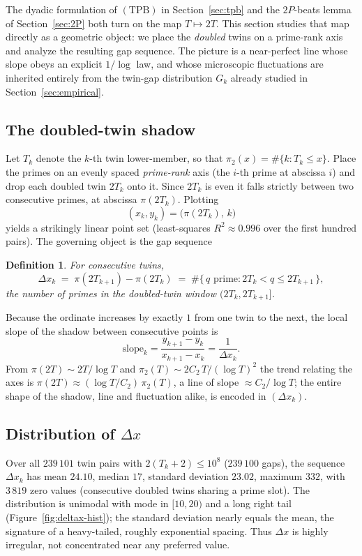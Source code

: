 \documentclass[11pt]{article}
\newtheorem{definition}[theorem]{Definition}
\begin{document}
The dyadic formulation of $(\mathrm{TPB})$ in Section~\ref{sec:tpb} and the
$2P$-beats lemma of Section~\ref{sec:2P} both turn on the map $T\mapsto 2T$.
This section studies that map directly as a geometric object: we place the
\emph{doubled} twins on a prime-rank axis and analyze the resulting gap
sequence. The picture is a near-perfect line whose slope obeys an explicit
$1/\log$ law, and whose microscopic fluctuations are inherited entirely from
the twin-gap distribution $G_k$ already studied in
Section~\ref{sec:empirical}.

\subsection{The doubled-twin shadow}\label{sec:deltax-def}

Let $T_k$ denote the $k$-th twin lower-member, so that
$\pi_2(x)=\#\{k:T_k\le x\}$. Place the primes on an evenly spaced
\emph{prime-rank} axis (the $i$-th prime at abscissa $i$) and drop each
doubled twin $2T_k$ onto it. Since $2T_k$ is even it falls strictly between
two consecutive primes, at abscissa $\pi(2T_k)$. Plotting
\[
   (x_k,y_k)=\bigl(\pi(2T_k),\,k\bigr)
\]
yields a strikingly linear point set (least-squares $R^2\approx 0.996$ over
the first hundred pairs). The governing object is the gap sequence

\begin{definition}\label{def:deltax}
For consecutive twins,
\[
   \Delta x_k \;=\; \pi(2T_{k+1})-\pi(2T_k)
   \;=\; \#\{\,q\text{ prime}: 2T_k<q\le 2T_{k+1}\,\},
\]
the number of primes in the doubled-twin window $(2T_k,2T_{k+1}]$.
\end{definition}

Because the ordinate increases by exactly $1$ from one twin to the next, the
local slope of the shadow between consecutive points is
\[
   \mathrm{slope}_k=\frac{y_{k+1}-y_k}{x_{k+1}-x_k}=\frac{1}{\Delta x_k}.
\tag{$\ast$}\label{eq:slope}
\]
From $\pi(2T)\sim 2T/\log T$ and $\pi_2(T)\sim 2C_2\,T/(\log T)^2$ the trend
relating the axes is $\pi(2T)\approx(\log T/C_2)\,\pi_2(T)$, a line of slope
$\approx C_2/\log T$; the entire shape of the shadow, line and fluctuation
alike, is encoded in $(\Delta x_k)$.

\subsection{Distribution of \texorpdfstring{$\Delta x$}{Delta x}}\label{sec:deltax-dist}

Over all $239\,101$ twin pairs with $2(T_k+2)\le 10^8$ ($239\,100$ gaps), the
sequence $\Delta x_k$ has mean $24.10$, median $17$, standard deviation
$23.02$, maximum $332$, with $3\,819$ zero values (consecutive doubled twins
sharing a prime slot). The distribution is unimodal with mode in $[10,20)$
and a long right tail (Figure~\ref{fig:deltax-hist}); the standard deviation
nearly equals the mean, the signature of a heavy-tailed, roughly exponential
spacing. Thus $\Delta x$ is highly irregular, not concentrated near any
preferred value.
\end{document}
